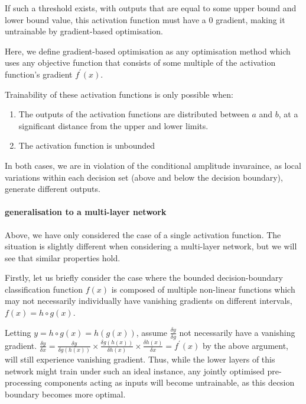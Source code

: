 \documentclass[9pt,conference]{IEEEtran}
\begin{document}
If such a threshold exists, with outputs that are equal to some upper bound and lower bound value, this activation function must have a 0 gradient, making it untrainable by gradient-based optimisation.

Here, we define gradient-based optimisation as any optimisation method which uses any objective function that consists of some multiple of the activation function's gradient $f^\prime\left(x\right)$.

Trainability of these activation functions is only possible when:

\begin{enumerate}
    \item The outputs of the activation functions are distributed between $a$ and $b$, at a significant distance from the upper and lower limits. 
    \item The activation function is unbounded
\end{enumerate}

In both cases, we are in violation of the conditional amplitude invaraince, as local variations within each decision set (above and below the decision boundary), generate different outputs. 

\paragraph{generalisation to a multi-layer network}

Above, we have only considered the case of a single activation function. The situation is slightly different when considering a multi-layer network, but we will see that similar properties hold.

Firstly, let us briefly consider the case where the bounded decision-boundary classification function $f(x)$ is composed of multiple non-linear functions which may not necessarily individually have vanishing gradients on different intervals, $f(x)=h\circ g(x)$.

Letting $y = h\circ g(x) = h(g(x))$, assume $\displaystyle \frac{\delta y}{\delta g}$  not necessarily have a vanishing gradient. $\displaystyle \frac{\delta y}{\delta x} =  \frac{\delta y}{\delta g(h(x))} \times \frac{\delta g(h(x))}{\delta h(x)} \times  \frac{\delta h(x)}{\delta x} = f^\prime(x)$ by the above argument, will still experience vanishing gradient. Thus, while the lower layers of this network might train under such an ideal instance, any jointly optimised pre-processing components acting as inputs will become untrainable, as this decsion boundary becomes more optimal.  
\end{document}
